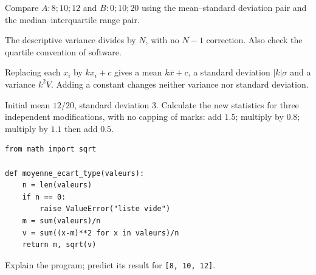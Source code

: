 \begin{example}Compare $A:8;10;12$ and $B:0;10;20$ using the mean--standard deviation pair and the median--interquartile range pair.\end{example}
\begin{teachernote}The descriptive variance divides by $N$, with no $N-1$ correction. Also check the quartile convention of software.\end{teachernote}
\begin{keypoint}[Property]
Replacing each $x_i$ by $kx_i+c$ gives a mean $k\overline x+c$, a standard deviation $|k|\sigma$ and a variance $k^2V$. Adding a constant changes neither variance nor standard deviation.
\end{keypoint}
\begin{example}Initial mean $12/20$, standard deviation $3$. Calculate the new statistics for three independent modifications, with no capping of marks: add $1.5$; multiply by $0.8$; multiply by $1.1$ then add $0.5$.\end{example}
\begin{lstlisting}
from math import sqrt

def moyenne_ecart_type(valeurs):
    n = len(valeurs)
    if n == 0:
        raise ValueError("liste vide")
    m = sum(valeurs)/n
    v = sum((x-m)**2 for x in valeurs)/n
    return m, sqrt(v)
\end{lstlisting}
\begin{example}Explain the program; predict its result for \texttt{[8, 10, 12]}.\end{example}
